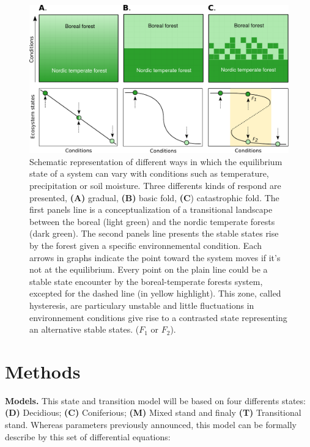 \begin{figure}[ht]       
\begin{center}
	\includegraphics[width=\textwidth]{fig/states.pdf}       
\end{center}
\caption{Schematic representation of different ways in which the equilibrium
state of a system can vary with conditions such as temperature, precipitation
or soil moisture. Three differents kinds of respond are presented,
\textbf{(A)} gradual, \textbf{(B)} basic fold, \textbf{(C}) catastrophic fold.
The first panels line is a conceptualization of a transitional landscape
between the boreal (light green) and the nordic temperate forests (dark
green). The second panels line presents the stable states rise by the forest
given a specific environnemental condition. Each arrows in graphs indicate the
point toward the system moves if it's not at the equilibrium. Every point on
the plain line could be a stable state encounter by the boreal-temperate
forests system, excepted for the dashed line (in yellow highlight). This zone,
called hysteresis, are particulary unstable and little fluctuations in
environnement conditions give rise to a contrasted state representing an
alternative stable states.  ($F_1$ or $F_2$).}


\label{fig1}
\end{figure}

\section{Methods}   

\textbf{Models.} This state and transition model will be based on four
differents states: \textbf{(D)} Decidious; \textbf{(C)} Coniferious;
\textbf{(M)} Mixed stand and finaly \textbf{(T)} Transitional stand. Whereas
parameters previously announced, this model can be formally describe by this
set of differential equations:


